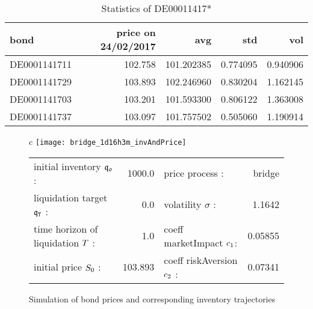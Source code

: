 \documentclass[10pt,a4paper]{article}
\begin{document}
\begin{table}
\centering
\begin{scriptsize}
	{
\begin{tabular}{lrrrr} 
 \textbf{bond}  &  \textbf{price  on  24/02/2017} &         \textbf{avg} &       \textbf{std} &        \textbf{vol} \\
 \hline
  DE0001141711 &              102.758 &  101.202385 &  0.774095 &         0.940906 \\
  DE0001141729 &              103.893 &  102.246960 &  0.830204 &         1.162145  \\
  DE0001141703 &              103.201 &  101.593300 &  0.806122 &          1.363008  \\
  DE0001141737 &              103.097 &  101.757502 &  0.505060 &         1.190914  
 	\end{tabular}} 
 \end{scriptsize}
\caption{{Statistics of DE00011417* }}
\label{tab.DE000stat}
\end{table}


\begin{center}
\begin{figure}
	\centering
	\begin{tabular}{c}
	\texttt{[image: bridge\_1d16h3m\_invAndPrice]} \\
		\begin{small}
			\begin{tabular}{lr | lr}
				initial inventory  $\mathfrak{q_0}   $ : & 1000.0   & price process : & bridge \\
				liquidation target $\mathfrak{q}_{\mathtt{T} }   $ : & 0.0 & volatility $\sigma   $ : & 1.1642\\
				time horizon of liquidation $T   $ : & 1.0 & coeff marketImpact $ c_{1}  $: & 0.05855\\
				initial price $S_0 $ : & 103.893 & 	coeff riskAversion $ c_{2}   $ : & 0.07341 \\
			\end{tabular}
		\end{small}
	\end{tabular}
	\caption{{Simulation of bond prices and corresponding inventory trajectories}}
	\label{fig.DE000_invAndPrice}
\end{figure}
\end{center}

\newpage 
\end{document}
